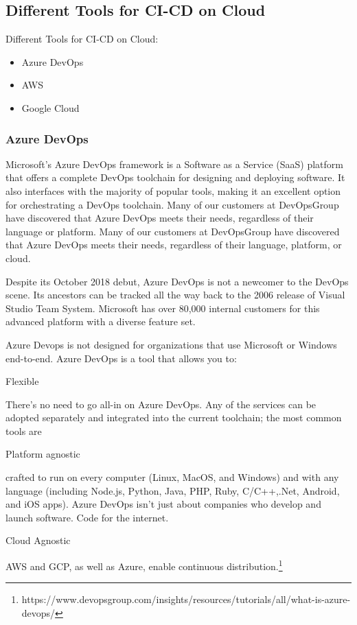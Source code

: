 \subsection{Different Tools for CI-CD on Cloud}
%
Different Tools for CI-CD on Cloud:
   \begin{itemize}
     \item Azure DevOps
     \item AWS
     \item Google Cloud
   \end{itemize}


%
\subsubsection{Azure DevOps}
%

Microsoft's Azure DevOps framework is a Software as a Service (SaaS) platform that offers a complete DevOps toolchain for designing and deploying software. It also interfaces with the majority of popular tools, making it an excellent option for orchestrating a DevOps toolchain. Many of our customers at DevOpsGroup have discovered that Azure DevOps meets their needs, regardless of their language or platform. Many of our customers at DevOpsGroup have discovered that Azure DevOps meets their needs, regardless of their language, platform, or cloud.


Despite its October 2018 debut, Azure DevOps is not a newcomer to the DevOps scene. Its ancestors can be tracked all the way back to the 2006 release of Visual Studio Team System. Microsoft has over 80,000 internal customers for this advanced platform with a diverse feature set.


Azure Devops is not designed for organizations that use Microsoft or Windows end-to-end. Azure DevOps is a tool that allows you to:


Flexible


There's no need to go all-in on Azure DevOps. Any of the services can be adopted separately and integrated into the current toolchain; the most common tools are

Platform agnostic


crafted to run on every computer (Linux, MacOS, and Windows) and with any language (including Node.js, Python, Java, PHP, Ruby, C/C++,.Net, Android, and iOS apps). Azure DevOps isn't just about companies who develop and launch software. Code for the internet.

Cloud Agnostic


AWS and GCP, as well as Azure, enable continuous distribution.\footnote{https://www.devopsgroup.com/insights/resources/tutorials/all/what-is-azure-devops/}


